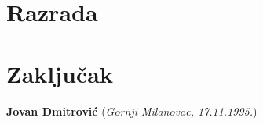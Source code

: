 \documentclass[12pt,oneside]{memoir}
\begin{document}

\chapter{Razrada}
\label{chp:razrada}

\chapter{Zaključak}

\literatura

\backmatter

\begin{biografija}
  \textbf{Jovan Dmitrović} (\emph{Gornji Milanovac, 17.11.1995.}) 
\end{biografija}
\end{document}
